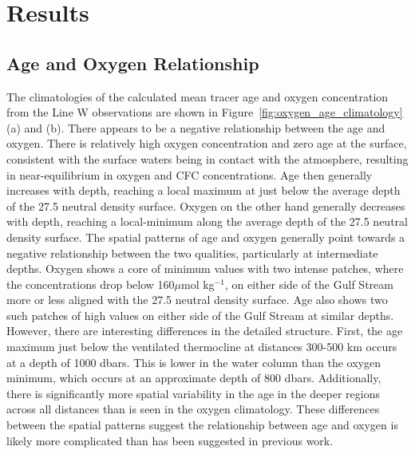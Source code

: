 \section{Results}
\label{section:results}
\subsection{Age and Oxygen Relationship}

The climatologies of the calculated mean tracer age and oxygen concentration from
the Line W observations are shown in Figure~\ref{fig:oxygen_age_climatology} (a)
and (b). There appears to be a negative relationship between the age and oxygen.
There is relatively high oxygen concentration and zero age at the surface, consistent
with the surface waters being in contact with the atmosphere, resulting in
near-equilibrium in oxygen and CFC concentrations. Age then generally increases
with depth, reaching a local maximum at just below the average depth of the 27.5
neutral density surface. Oxygen on the other hand generally decreases with depth,
reaching a local-minimum along the average depth of the 27.5 neutral density surface.
The spatial patterns of age and oxygen generally point towards a negative relationship
between the two qualities, particularly at intermediate depths. Oxygen shows a
core of minimum values with two intense patches, where the concentrations drop
below 160$\mu$mol kg$^{-1}$, on either side of the Gulf Stream more or less aligned
with the 27.5 neutral density surface. Age also shows two such patches of high
values on either side of the Gulf Stream at similar depths. However, there are
interesting differences in the detailed structure. First, the age maximum just
below the ventilated thermocline at distances 300-500 km occurs at a depth of 1000
dbars. This is lower in the water column than the oxygen minimum, which occurs
at an approximate depth of 800 dbars. Additionally, there is significantly more
spatial variability in the age in the deeper regions across all distances than
is seen in the oxygen climatology. These differences between the spatial patterns
suggest the relationship between age and oxygen is likely more complicated than has
been suggested in previous work.

